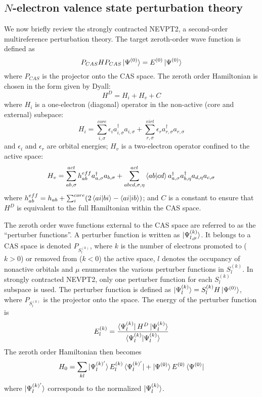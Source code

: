 \subsection{$N$-electron valence state perturbation theory} 

We now briefly review the strongly contracted NEVPT2\cite{angeli_n-electron_2001, angeli_n-electron_2002}, a second-order 
multireference perturbation theory. The target zeroth-order wave function is defined as 
\begin{equation}
P_{CAS}HP_{CAS} \ket{\Psi^{(0)}} = E^{(0)} \ket{\Psi^{(0)}}
\end{equation}
where $P_{CAS}$ is the projector onto the CAS space. 
The zeroth order Hamiltonian is chosen in the form given by Dyall\cite{dyall_choice_1995}:
\begin{equation}
  H^D = H_i + H_v + C
\end{equation}
where $H_i$ is a one-electron (diagonal) operator in the non-active (core and external) subspace:
\begin{equation}
  H_i = \sum_{i,\sigma}^{core} \epsilon_i  a^\dagger_{i,\sigma} a_{i,\sigma} + \sum_{r,\sigma}^{virt} \epsilon_r  a^\dagger_{r,\sigma} a_{r,\sigma}
\end{equation}
and $\epsilon_i $ and $\epsilon_r$ are orbital energies; 
$H_v$ is a two-electron operator confined to the active space:
\begin{equation}
  H_v = \sum_{ab,\sigma}^{act} h^{eff}_{ab}  a^\dagger_{a,\sigma}  a_{b,\sigma} + \sum_{abcd,\sigma,\eta}^{act} \braket{ab|cd}  a^\dagger_{a,\sigma} a^\dagger_{b,\eta} a_{d,\eta} a_{c,\sigma}
\end{equation}
where $h_{ab}^{eff} = h_{ab} + \sum_{i}^{core} (2\braket{ai|bi}-\braket{ai|ib})$;
and $C$ is a constant to ensure that $H^D$ is equivalent to the full Hamiltonian within the CAS space.

The zeroth order wave functions external to the CAS space are referred to as the ``perturber functions''. A perturber function is written  as $\ket{\Psi^{(k)}_{l,\mu}}$.
It belongs to a CAS space is denoted $P_{S_l^{(k)}}$, where $k$ is the number of electrons promoted to ($k>0$) or removed from ($k<0$) the active space, $l$ denotes the occupancy of nonactive orbitals and $\mu$ enumerates the various perturber functions in $S_l^{(k)}$.  
In strongly contracted NEVPT2, only one perturber function for each $S_l^{(k)}$ subspace is used. The perturber function is defined as $\ket{\Psi^{(k)}_l} = S^{(k)}_l H \ket{\Psi^{(0)}}$, where $P_{S_l^{(k)}}$ is the projector onto the space. The energy of
the perturber function is
\begin{equation}
  E^{(k)}_l = \frac{\bra{\Psi^{(k)}_l}H^D\ket{\Psi^{(k)}_l}}{\braket{\Psi^{(k)}_l|\Psi^{(k)}_l}}
\end{equation}
The zeroth order Hamiltonian then becomes
\begin{equation}
  H_0 = \sum_{kl} \ket{\Psi^{(k)'}_l}E^{(k)}_l \bra{\Psi^{(k)'}_l} +\ket{\Psi^{(0)}}E^{(0)} \bra{\Psi^{(0)}}
\end{equation}
where $\ket{\Psi^{(k)'}_l}$ corresponds to the normalized $\ket{\Psi^{(k)}_l}$.


